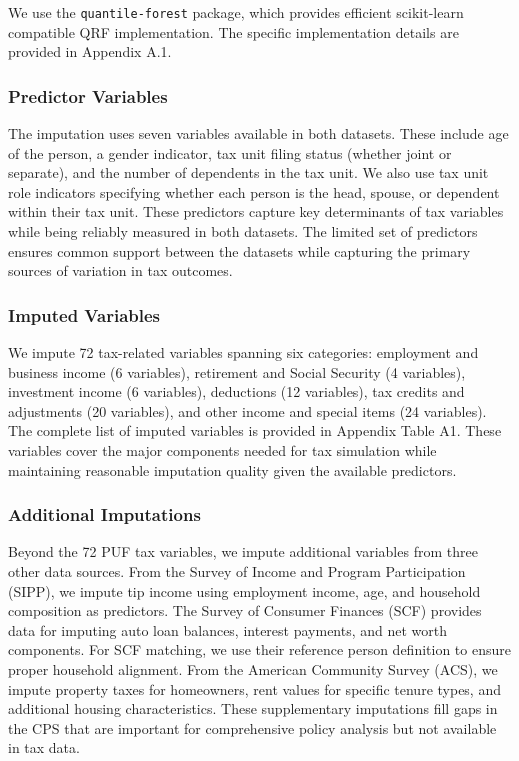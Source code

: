 We use the \texttt{quantile-forest} package, which provides efficient scikit-learn compatible QRF implementation. The specific implementation details are provided in Appendix A.1.

\subsubsection{Predictor Variables}

The imputation uses seven variables available in both datasets. These include age of the person, a gender indicator, tax unit filing status (whether joint or separate), and the number of dependents in the tax unit. We also use tax unit role indicators specifying whether each person is the head, spouse, or dependent within their tax unit. These predictors capture key determinants of tax variables while being reliably measured in both datasets. The limited set of predictors ensures common support between the datasets while capturing the primary sources of variation in tax outcomes.

\subsubsection{Imputed Variables}

We impute 72 tax-related variables spanning six categories: employment and business income (6 variables), retirement and Social Security (4 variables), investment income (6 variables), deductions (12 variables), tax credits and adjustments (20 variables), and other income and special items (24 variables). The complete list of imputed variables is provided in Appendix Table A1. These variables cover the major components needed for tax simulation while maintaining reasonable imputation quality given the available predictors.

\subsubsection{Additional Imputations}

Beyond the 72 PUF tax variables, we impute additional variables from three other data sources. From the Survey of Income and Program Participation (SIPP), we impute tip income using employment income, age, and household composition as predictors. The Survey of Consumer Finances (SCF) provides data for imputing auto loan balances, interest payments, and net worth components. For SCF matching, we use their reference person definition to ensure proper household alignment. From the American Community Survey (ACS), we impute property taxes for homeowners, rent values for specific tenure types, and additional housing characteristics. These supplementary imputations fill gaps in the CPS that are important for comprehensive policy analysis but not available in tax data.


